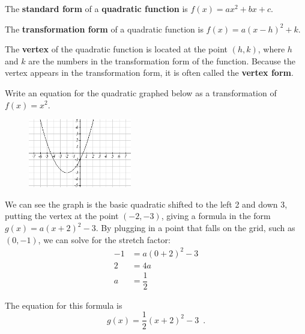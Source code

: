 \begin{definition}
The {\bf standard form} of a {\bf quadratic function} is $f(x)=ax^2+bx+c$.

The {\bf transformation form} of a quadratic function is $f(x)=a(x-h)^2+k$.

The {\bf vertex} of the quadratic function is located at the point $(h,k)$, where $h$ and $k$ are the numbers in the transformation form of the function. Because the vertex appears in the transformation form, it is often called the {\bf vertex form}.
\end{definition}
\begin{example}
Write an equation for the quadratic graphed below as a transformation of $f(x)=x^2$.

\begin{figure}[!ht]
\centering
\includegraphics[width=0.4\textwidth]{img/chap1/sec1-5/image057.png}
\caption{}
\end{figure}
\begin{solution} We can see the graph is the basic quadratic shifted to the left 2 and down 3, putting the vertex at the point $(-2,-3)$, giving a formula in the form $g(x)=a(x+2)^2-3$. By plugging in a point that falls on the grid, such as $(0,-1)$, we can solve for the stretch factor:
\begin{align*}
		-1 &= a(0+2)^2-3 \\
		2  &= 4a \\
		a  &= \dfrac{1}{2}
	\end{align*}

The equation for this formula is
\[ g(x)=\dfrac{1}{2}(x+2)^2-3 \enspace .\]
\end{solution}\end{example}

